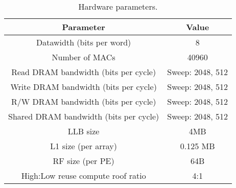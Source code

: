 
\begin{table}
\begin{scriptsize}
        \centering
    \caption {Hardware parameters.}
    \begin{tabular}{|c|c|}
    \hline
    \textbf{Parameter} & \textbf{Value}\\\hline
       Datawidth (bits per word) & 8\\\hline
       Number of MACs  &  40960\\\hline
       Read DRAM bandwidth (bits per cycle) & Sweep: 2048, 512  \\\hline
       Write DRAM bandwidth (bits per cycle) & Sweep: 2048, 512  \\\hline
       R/W DRAM bandwidth (bits per cycle) & Sweep: 2048, 512  \\\hline
       Shared DRAM bandwidth (bits per cycle) & Sweep: 2048, 512  \\\hline
       LLB size  & 4MB \\\hline
       L1 size (per array)  & 0.125 MB\\\hline
       RF size (per PE)  & 64B\\\hline
       High:Low reuse compute roof ratio & 4:1\\\hline
    \end{tabular}
    \label{tables:config}
    \end{scriptsize}
\end{table}